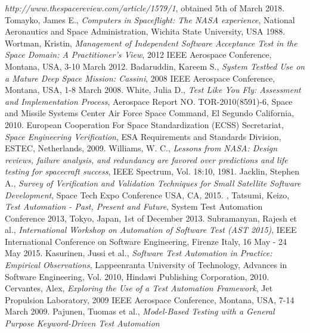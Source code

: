 \documentclass[english,12pt,a4paper,pdftex,elec,utf8]{aaltothesis}
\begin{document}
\begin{thebibliography}{99}
  \textit{http://www.thespacereview.com/article/1579/1}, obtained 5th of March 2018.
 Tomayko, James E.,
  \textit{Computers in Spaceflight: The NASA experience}, National Aeronautics and Space Administration, Wichita State University, USA 1988.
 Wortman, Kristin,
  \textit{Management of Independent Software Acceptance Test in the Space Domain: A Practitioner's View}, 2012 IEEE Aerospace Conference, Montana, USA, 3-10 March 2012.
 Badaruddin, Kareem S.,
  \textit{System Testbed Use on a Mature Deep Space Mission: Cassini}, 2008 IEEE Aerospace Conference, Montana, USA, 1-8 March 2008.
 White, Julia D.,
  \textit{Test Like You Fly: Assessment and Implementation Process}, Aerospace Report NO.
TOR-2010(8591)-6, Space and Missile Systems Center Air Force Space Command, El Segundo California, 2010.
 European Cooperation For Space Standardization (ECSS) Secretariat,
  \textit{Space Engineering Verification}, ESA Requirements and Standards Division, ESTEC, Netherlands, 2009.
 Williams, W. C.,
  \textit{Lessons from NASA: Design reviews, failure analysis, and redundancy are favored over predictions and life testing for spacecraft success}, IEEE Spectrum, Vol. 18:10, 1981.
 Jacklin, Stephen A.,
  \textit{Survey of Verification and Validation Techniques for Small Satellite Software Development}, Space Tech Expo Conference USA, CA, 2015.
, Tatsumi, Keizo,
  \textit{Test Automation - Past, Present and Future}, System Test Automation Conference 2013,  Tokyo, Japan, 1st of December 2013.
 Subramanyan, Rajesh et al.,
  \textit{ International Workshop on Automation of Software Test (AST 2015)},  IEEE International Conference on Software Engineering, Firenze Italy, 16 May - 24 May 2015.
 Kasurinen, Jussi et al.,
  \textit{Software Test Automation in Practice: Empirical Observations}, Lappeenranta University of Technology, Advances in Software Engineering, Vol. 2010, Hindawi Publishing Corporation, 2010.
 Cervantes, Alex,
  \textit{Exploring the Use of a Test Automation Framework}, Jet Propulsion Laboratory, 2009 IEEE Aerospace Conference, Montana, USA, 7-14 March 2009.
 Pajunen, Tuomas et al.,
  \textit{Model-Based Testing with a General Purpose Keyword-Driven Test Automation
}
\end{thebibliography}
\end{document}
